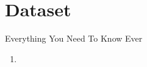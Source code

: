 \section{Dataset}
\begin{frame}{Everything You Need To Know Ever }
    \begin{enumerate}
        \item 
    \end{enumerate}
\end{frame}